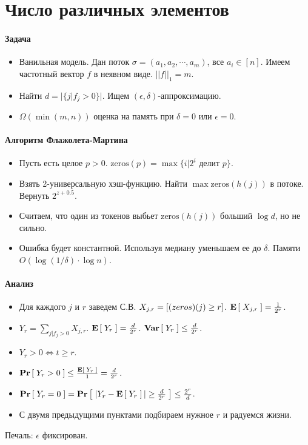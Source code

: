 \section{Число различных элементов} %
\label{sec:distinct_elements}

\paragraph{Задача} %
\label{par:problem}
\begin{itemize}
	\item Ванильная модель. Дан поток $\sigma = (a_1, a_2, \cdots, a_m)$, все $a_i \in [n]$. Имеем частотный вектор $f$ в неявном виде. $||f||_1 = m$. 
	\item Найти $d = |\{j | f_j > 0 \}|$. Ищем $(\epsilon, \delta)$-аппроксимацию.
	\item $\Omega( \min(m, n) )$ оценка на память при $\delta = 0$ или $\epsilon = 0$.	
\end{itemize}

\paragraph{Алгоритм Флажолета-Мартина} %
\label{par:flajolet_martin}

\begin{itemize}
	\item Пусть есть целое $p > 0$. $\text{zeros}(p) = \max \{i | 2^i \text{ делит } p\}$.
	\item Взять 2-универсальную хэш-функцию. Найти $\max \text{zeros}(h(j))$ в потоке. Вернуть $2^{z + 0.5}$.
	\item Считаем, что один из токенов выбьет $\text{zeros}(h(j))$ больший $\log d$, но не сильно.	
	\item Ошибка будет константной. Используя медиану уменьшаем ее до $\delta$. Памяти $O(\log(1 \slash \delta) \cdot \log n)$.
\end{itemize}

\paragraph{Анализ} %
\label{par:analysis}
\begin{itemize}
	\item Для каждого $j$ и $r$ заведем С.В. $X_{j, r} = [ \text(zeros)(j) \geq r ]$. $\textbf{E}\left[\; X_{j, r} \;\right] = \frac{1}{2^r}$.
	\item $Y_r = \sum_{j | f_j > 0} X_{j, r}$. $\textbf{E}\left[\; Y_r \;\right] = \frac{d}{2^r}$. $\textbf{Var}\left[\; Y_r \;\right] \leq \frac{d}{2^r}$.
	\item $Y_r > 0 \Leftrightarrow t \geq r$.
	\item $\textbf{Pr}\left[\; Y_r > 0 \;\right] \leq \frac{\textbf{E}\left[\; Y_r \;\right]}{1} = \frac{d}{2^r}$.
	\item $\textbf{Pr}\left[\; Y_r = 0 \;\right] = \textbf{Pr}\left[\; |Y_r - \textbf{E}\left[\; Y_r \;\right]| \geq \frac{d}{2^r} \;\right] \leq \frac{2^r}{d}$.
	\item С двумя предыдущими пунктами подбираем нужное $r$ и радуемся жизни.
\end{itemize}

Печаль: $\epsilon$ фиксирован.


